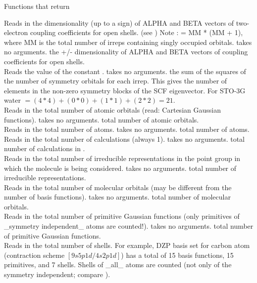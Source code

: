 \begin{center}
Functions that return 
\end{center}
{Reads in the dimensionality (up to a sign) of ALPHA and BETA vectors of 
two-electron coupling coefficients for open shells. (see )
Note :  = MM * (MM + 1), where MM is the total number of
irreps containing singly occupied orbitals.}
{takes no arguments.}
{the +/- dimensionality of ALPHA and BETA vectors of 
coupling coefficients for open shells.} \\
{Reads the value of the constant .}
{takes no arguments.}
{the sum of the squares of the number of symmetry
orbitals for each irrep.  This gives the number of elements in the
non-zero symmetry blocks of the SCF eigenvector.  For STO-3G water
$ = (4*4) + (0*0) + (1*1) + (2*2) = 21$.} \\
{Reads in the total number of atomic orbitals (read: Cartesian Gaussian functions).}
{takes no arguments.}
{total number of atomic orbitals.} \\
{Reads in the total number of atoms.}
{takes no arguments.}
{total number of atoms.} \\
{Reads in the total number of calculations (always 1).}
{takes no arguments.}
{total number of calculations in .} \\
{Reads in the total number of irreducible representations
in the point group in which the molecule is being considered.}
{takes no arguments.}
{total number of irreducible representations.} \\
{Reads in the total number of molecular orbitals (may be different
from the number of basis functions).}
{takes no arguments.}
{total number of molecular orbitals.} \\
{Reads in the total number of primitive Gaussian functions 
(only primitives of \_symmetry independent\_ atoms are counted!).}
{takes no arguments.}
{total number of primitive Gaussian functions.} \\
{Reads in the total number of shells. For example, DZP basis set for 
carbon atom (contraction scheme $[9s5p1d/4s2p1d]$) has a total of 15 basis 
functions, 15 primitives, and 7 shells. Shells of \_all\_ atoms are counted
(not only of the symmetry independent; compare ).}
